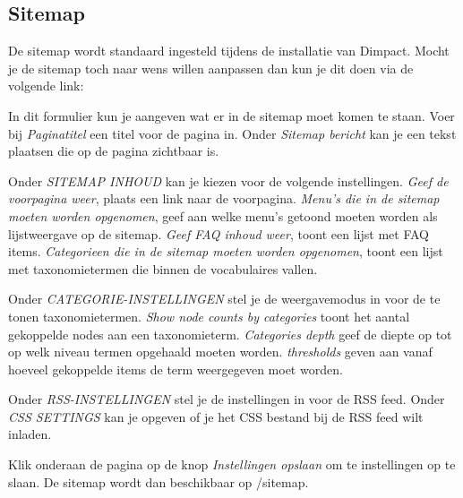 \subsection{Sitemap}\label{sitemap}
De sitemap wordt standaard ingesteld tijdens de installatie van Dimpact. Mocht je de sitemap toch naar wens willen aanpassen dan kun je dit doen via de volgende link: 

In dit formulier kun je aangeven wat er in de sitemap moet komen te staan. Voer bij \emph{Paginatitel} een titel voor de pagina in. Onder \emph{Sitemap bericht} kan je een tekst plaatsen die op de pagina zichtbaar is. 

Onder \emph{SITEMAP INHOUD} kan je kiezen voor de volgende instellingen. \emph{Geef de voorpagina weer}, plaats een link naar de voorpagina. \emph{Menu's die in de sitemap moeten worden opgenomen}, geef aan welke menu's getoond moeten worden als lijstweergave op de sitemap. \emph{Geef FAQ inhoud weer}, toont een lijst met FAQ items. \emph{Categorieen die in de sitemap moeten worden opgenomen}, toont een lijst met taxonomietermen die binnen de vocabulaires vallen.

Onder \emph{CATEGORIE-INSTELLINGEN} stel je de weergavemodus in voor de te tonen taxonomietermen. \emph{Show node counts by categories} toont het aantal gekoppelde nodes aan een taxonomieterm. \emph{Categories depth} geef de diepte op tot op welk niveau termen opgehaald moeten worden. \emph{thresholds} geven aan vanaf hoeveel gekoppelde items de term weergegeven moet worden.

Onder \emph{RSS-INSTELLINGEN} stel je de instellingen in voor de RSS feed. Onder \emph{CSS SETTINGS} kan je opgeven of je het CSS bestand bij de RSS feed wilt inladen.

Klik onderaan de pagina op de knop \emph{Instellingen opslaan} om te instellingen op te slaan. De sitemap wordt dan beschikbaar op /sitemap.
